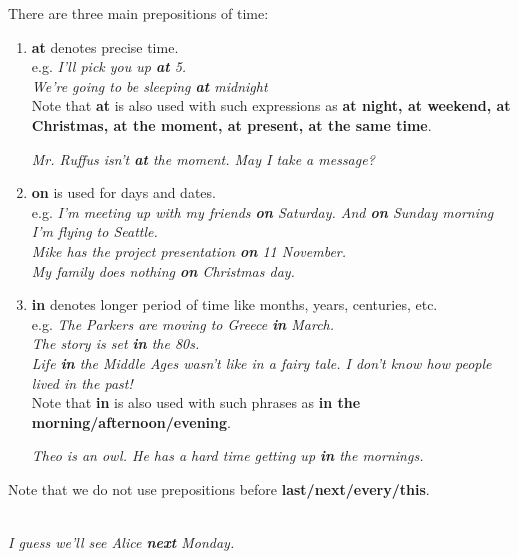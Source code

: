 \documentclass[hidelinks,10pt,a4paper]{article}
\begin{document}
There are three main prepositions of time:
\begin{enumerate}[label=(\alph*)]
	\item \textbf{at} denotes precise time. \\
		e.g. \textit{I'll pick you up \textbf{at} 5.\\
		We're going to be sleeping \textbf{at} midnight}  \\

		Note that \textbf{at} is also used with such expressions as \textbf{at night, at weekend, at Christmas, at the moment, at present, at the same time}.

		\begin{center}
			\textit{Mr. Ruffus isn't \textbf{at} the moment. May I take a message?}
		\end{center}
	\item \textbf{on} is used for days and dates. \\
		e.g. \textit{I'm meeting up with my friends \textbf{on} Saturday. And \textbf{on} Sunday morning I'm flying to Seattle.}\\
		\textit{Mike has the project presentation \textbf{on} 11 November.}\\
		\textit{My family does nothing \textbf{on} Christmas day.}
	\item \textbf{in} denotes longer period of time like months, years, centuries, etc. \\
		e.g. \textit{The Parkers are moving to Greece \textbf{in} March.\\
		The story is set \textbf{in} the 80s.\\
		Life \textbf{in} the Middle Ages wasn't like in a fairy tale. I don't know how people lived in the past!} \\

		Note that \textbf{in} is also used with such phrases as \textbf{in the morning/afternoon/evening}.

		\begin{center}
			\textit{Theo is an owl. He has a hard time getting up \textbf{in} the mornings. }
		\end{center}

\end{enumerate}

Note that we do not use prepositions before \textbf{last/next/every/this}.\\
\begin{center}
	\textit{\\
	I guess we'll see Alice \textbf{next} Monday.}
\end{center}
\end{document}
